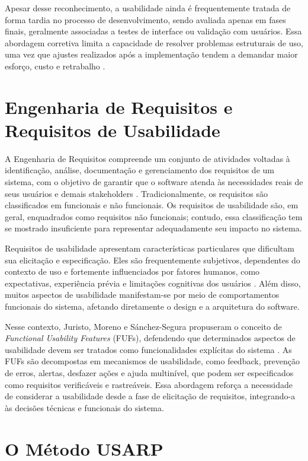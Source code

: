 Apesar desse reconhecimento, a usabilidade ainda é frequentemente tratada de forma tardia no processo de desenvolvimento, sendo avaliada apenas em fases finais, geralmente associadas a testes de interface ou validação com usuários. Essa abordagem corretiva limita a capacidade de resolver problemas estruturais de uso, uma vez que ajustes realizados após a implementação tendem a demandar maior esforço, custo e retrabalho \cite{juristo2007}.

\section{Engenharia de Requisitos e Requisitos de Usabilidade}

A Engenharia de Requisitos compreende um conjunto de atividades voltadas à identificação, análise, documentação e gerenciamento dos requisitos de um sistema, com o objetivo de garantir que o software atenda às necessidades reais de seus usuários e demais stakeholders \cite{sommerville2011}. Tradicionalmente, os requisitos são classificados em funcionais e não funcionais. Os requisitos de usabilidade são, em geral, enquadrados como requisitos não funcionais; contudo, essa classificação tem se mostrado insuficiente para representar adequadamente seu impacto no sistema.

Requisitos de usabilidade apresentam características particulares que dificultam sua elicitação e especificação. Eles são frequentemente subjetivos, dependentes do contexto de uso e fortemente influenciados por fatores humanos, como expectativas, experiência prévia e limitações cognitivas dos usuários \cite{ardito2014}. Além disso, muitos aspectos de usabilidade manifestam-se por meio de comportamentos funcionais do sistema, afetando diretamente o design e a arquitetura do software.

Nesse contexto, Juristo, Moreno e Sánchez-Segura propuseram o conceito de \textit{Functional Usability Features} (FUFs), defendendo que determinados aspectos de usabilidade devem ser tratados como funcionalidades explícitas do sistema \cite{juristo2007}. As FUFs são decompostas em mecanismos de usabilidade, como feedback, prevenção de erros, alertas, desfazer ações e ajuda multinível, que podem ser especificados como requisitos verificáveis e rastreáveis. Essa abordagem reforça a necessidade de considerar a usabilidade desde a fase de elicitação de requisitos, integrando-a às decisões técnicas e funcionais do sistema.

\section{O Método USARP}

